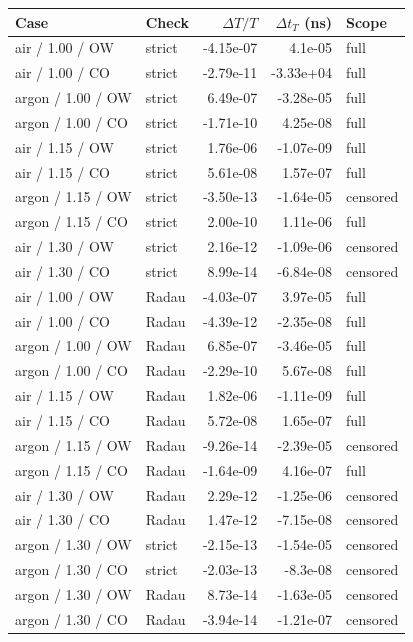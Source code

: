 \begin{tabular}{llrrl}\toprule
Case & Check & $\Delta T/T$ & $\Delta t_T$ (ns) & Scope \\
\midrule
air / 1.00 / OW & strict & -4.15e-07 & 4.1e-05 & full \\
air / 1.00 / CO & strict & -2.79e-11 & -3.33e+04 & full \\
argon / 1.00 / OW & strict & 6.49e-07 & -3.28e-05 & full \\
argon / 1.00 / CO & strict & -1.71e-10 & 4.25e-08 & full \\
air / 1.15 / OW & strict & 1.76e-06 & -1.07e-09 & full \\
air / 1.15 / CO & strict & 5.61e-08 & 1.57e-07 & full \\
argon / 1.15 / OW & strict & -3.50e-13 & -1.64e-05 & censored \\
argon / 1.15 / CO & strict & 2.00e-10 & 1.11e-06 & full \\
air / 1.30 / OW & strict & 2.16e-12 & -1.09e-06 & censored \\
air / 1.30 / CO & strict & 8.99e-14 & -6.84e-08 & censored \\
air / 1.00 / OW & Radau & -4.03e-07 & 3.97e-05 & full \\
air / 1.00 / CO & Radau & -4.39e-12 & -2.35e-08 & full \\
argon / 1.00 / OW & Radau & 6.85e-07 & -3.46e-05 & full \\
argon / 1.00 / CO & Radau & -2.29e-10 & 5.67e-08 & full \\
air / 1.15 / OW & Radau & 1.82e-06 & -1.11e-09 & full \\
air / 1.15 / CO & Radau & 5.72e-08 & 1.65e-07 & full \\
argon / 1.15 / OW & Radau & -9.26e-14 & -2.39e-05 & censored \\
argon / 1.15 / CO & Radau & -1.64e-09 & 4.16e-07 & full \\
air / 1.30 / OW & Radau & 2.29e-12 & -1.25e-06 & censored \\
air / 1.30 / CO & Radau & 1.47e-12 & -7.15e-08 & censored \\
argon / 1.30 / OW & strict & -2.15e-13 & -1.54e-05 & censored \\
argon / 1.30 / CO & strict & -2.03e-13 & -8.3e-08 & censored \\
argon / 1.30 / OW & Radau & 8.73e-14 & -1.63e-05 & censored \\
argon / 1.30 / CO & Radau & -3.94e-14 & -1.21e-07 & censored \\
\bottomrule\end{tabular}
